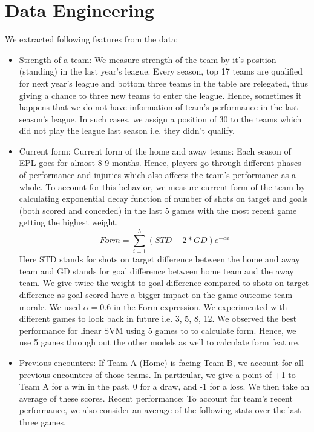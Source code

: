 \documentclass{article}
\begin{document}
\section{Data Engineering}
We extracted following features from the data:
\begin{itemize}
	\item Strength of a team: We measure strength of the team by it's position (standing) in the last year's league. Every season, top 17 teams are qualified for next year's league and bottom three teams in the table are relegated, thus giving a chance to three new teams to enter the league. Hence, sometimes it happens that we do not have information of team's performance in the last season's league. In such cases, we assign a position of 30 to the teams which did not play the league last season i.e. they didn't qualify.
	
	\item Current form: Current form of the home and away teams: Each season of EPL goes for almost 8-9 months. Hence, players go through different phases of performance and injuries which also affects the team's performance as a whole. To account for this behavior, we measure current form of the team by calculating exponential decay function of number of shots on target and goals (both scored and conceded) in the last 5 games with the most recent game getting the highest weight.
	\[Form=\sum_{i=1}^5(STD+2*GD)e^{-\alpha i}\]
	Here STD stands for shots on target difference between the home and away team and GD stands for goal difference between home team and the away team. We give twice the weight to goal difference compared to shots on target difference as goal scored have a bigger impact on the game outcome team morale.
	We used $\alpha=0.6$ in the Form expression. We experimented with different games to look back in future i.e. 3, 5, 8, 12. We observed the best performance for linear SVM using 5 games to to calculate form. Hence, we use 5 games through out the other models as well to calculate form feature.
	
	\item Previous encounters: If Team A (Home) is facing Team B, we  account for all previous encounters of those teams. In particular, we give a point of +1 to Team A for a win in the past, 0 for a draw, and -1 for a loss. We then take an average of these scores.
	Recent performance: To account for team's recent performance, we also consider an average of the following stats over the last three games.
	

\end{itemize}
\end{document}
